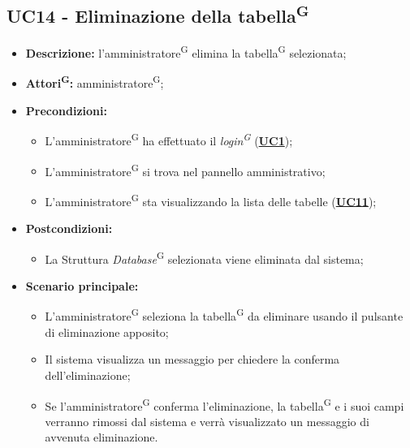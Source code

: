 \subsection{UC14 - Eliminazione della tabella\textsuperscript{G}}
\label{sec:UC14}
\begin{itemize}
	\item \textbf{Descrizione:} l’amministratore\textsuperscript{G} elimina la tabella\textsuperscript{G} selezionata;
	\item \textbf{Attori\textsuperscript{G}:} amministratore\textsuperscript{G};
	\item \textbf{Precondizioni:} 
	\begin{itemize}
		\item L’amministratore\textsuperscript{G} ha effettuato il \textit{login\textsuperscript{G}} (\hyperref[sec:UC1]{\textbf{UC1}});
		\item L’amministratore\textsuperscript{G} si trova nel pannello amministrativo;
		\item L’amministratore\textsuperscript{G} sta visualizzando la lista delle tabelle (\hyperref[sec:UC11]{\textbf{UC11}});
	\end{itemize}
	\item \textbf{Postcondizioni:} 
	\begin{itemize}
		\item La Struttura \textit{Database}\textsuperscript{G} selezionata viene eliminata dal sistema;
	\end{itemize}
	\item \textbf{Scenario principale:} 
	\begin{itemize}
		\item L'amministratore\textsuperscript{G} seleziona la tabella\textsuperscript{G} da eliminare usando il pulsante di eliminazione apposito;
		\item Il sistema visualizza un messaggio per chiedere la conferma dell'eliminazione;
		\item Se l'amministratore\textsuperscript{G} conferma l'eliminazione, la tabella\textsuperscript{G} e i suoi campi verranno rimossi dal sistema e verrà visualizzato un messaggio di avvenuta eliminazione.
	\end{itemize}
\end{itemize}

